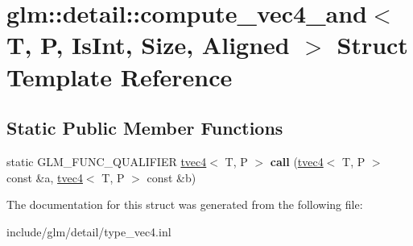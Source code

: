 \hypertarget{structglm_1_1detail_1_1compute__vec4__and}{}\section{glm\+:\+:detail\+:\+:compute\+\_\+vec4\+\_\+and$<$ T, P, Is\+Int, Size, Aligned $>$ Struct Template Reference}
\label{structglm_1_1detail_1_1compute__vec4__and}
\subsection*{Static Public Member Functions}
\begin{DoxyCompactItemize}
\item 
\mbox{\label{structglm_1_1detail_1_1compute__vec4__and_aff5381ad526cbd7427393b39d200255e}} 
static G\+L\+M\+\_\+\+F\+U\+N\+C\+\_\+\+Q\+U\+A\+L\+I\+F\+I\+ER \hyperlink{structglm_1_1tvec4}{tvec4}$<$ T, P $>$ {\bfseries call} (\hyperlink{structglm_1_1tvec4}{tvec4}$<$ T, P $>$ const \&a, \hyperlink{structglm_1_1tvec4}{tvec4}$<$ T, P $>$ const \&b)
\end{DoxyCompactItemize}


The documentation for this struct was generated from the following file\+:\begin{DoxyCompactItemize}
\item 
include/glm/detail/type\+\_\+vec4.\+inl\end{DoxyCompactItemize}
